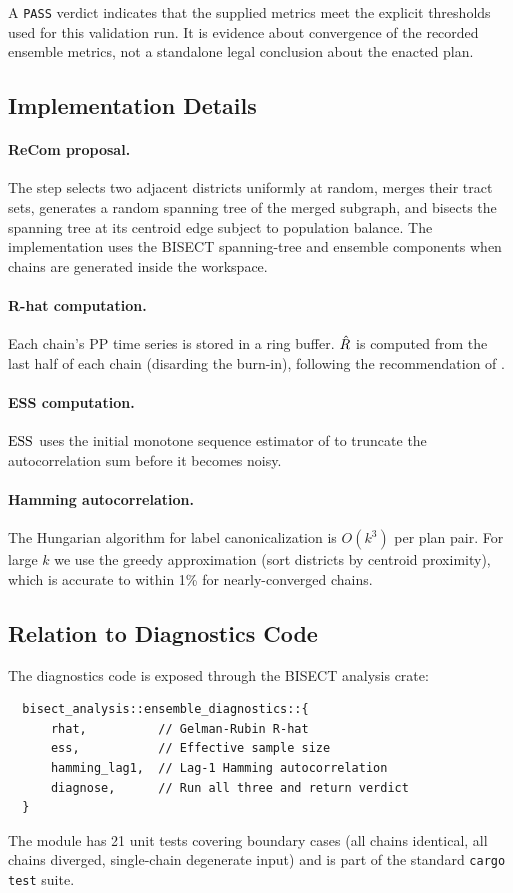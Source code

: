 A \texttt{PASS} verdict indicates that the supplied metrics meet the explicit
thresholds used for this validation run. It is evidence about convergence of
the recorded ensemble metrics, not a standalone legal conclusion about the
enacted plan.

\subsection{Implementation Details}

\paragraph{ReCom proposal.}
The \recom{} step selects two adjacent districts uniformly at random,
merges their tract sets, generates a random spanning tree of the merged
subgraph, and bisects the spanning tree at its centroid edge subject to
population balance.
The implementation uses the BISECT spanning-tree and ensemble components when
chains are generated inside the workspace.

\paragraph{R-hat computation.}
Each chain's PP time series is stored in a ring buffer.
$\hat{R}$ is computed from the last half of each chain (disarding the
burn-in), following the recommendation of \citet{vehtari2021}.

\paragraph{ESS computation.}
$\mathrm{ESS}$ uses the initial monotone sequence estimator of \citet{geyer1992}
to truncate the autocorrelation sum before it becomes noisy.

\paragraph{Hamming autocorrelation.}
The Hungarian algorithm for label canonicalization is $O(k^3)$ per plan
pair. For large $k$ we use the greedy approximation (sort districts by
centroid proximity), which is accurate to within 1\% for nearly-converged
chains.

\subsection{Relation to Diagnostics Code}

The diagnostics code is exposed through the BISECT analysis crate:

\begin{verbatim}
  bisect_analysis::ensemble_diagnostics::{
      rhat,          // Gelman-Rubin R-hat
      ess,           // Effective sample size
      hamming_lag1,  // Lag-1 Hamming autocorrelation
      diagnose,      // Run all three and return verdict
  }
\end{verbatim}

The module has 21 unit tests covering boundary cases (all chains identical,
all chains diverged, single-chain degenerate input) and is part of the
standard \texttt{cargo test} suite.
